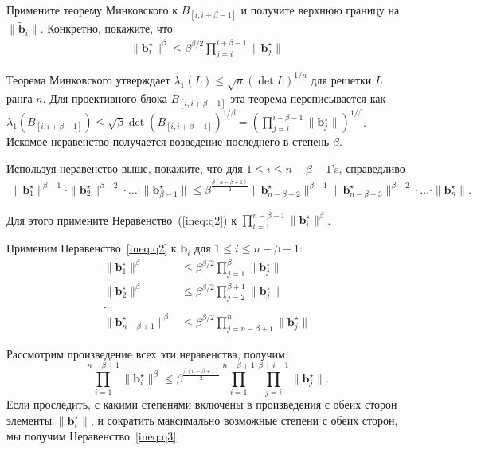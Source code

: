 \documentclass[11pt]{exam}
\theoremstyle{definition}
\renewcommand{\vec}{\mathbf}
\begin{document}
{\begin{questions}
		\question Примените теорему Минковского к $B_{[i, i+\beta-1]}$ и получите верхнюю границу на  $	\| \tilde{\vec{b}}_i \|$. Конкретно, покажите, что
		\begin{align} \label{ineq:q2}
			\| {\vec b}_i^\star \|^\beta \leq \beta^{\beta/2} \prod_{j=i}^{i+\beta - 1} \| {\vec b}^\star_j \|
		\end{align}
	
		\begin{solution}
			Теорема Минковского утверждает $\lambda_1(L) \leq \sqrt{n} (\det L)^{1/n}$ для решетки $L$ ранга $n$. Для проективного блока $B_[i, i+\beta-1]$ эта теорема переписывается как $\lambda_1(B_[i, i+\beta-1]) \leq \sqrt{\beta} \det(B_[i, i+\beta-1])^{1/\beta} = (\prod_{j=i}^{i+\beta-1} \| \vec b_j^\star \|)^{1/\beta}$. Искомое неравенство получается возведение последнего в степень $\beta$.
		\end{solution}
		
		\question Используя неравенство выше, покажите, что для $1 \leq i \leq n-\beta +1$'s, справедливо
		\begin{align}\label{ineq:q3}
		\| {\vec{b}}_1^\star \|^{\beta-1} \cdot \| {\vec{b}}_2^\star \|^{\beta-2} \cdot \ldots \cdot \| {\vec{b}}^\star_{\beta-1} \| \leq 
		\beta^{\frac{\beta(n-\beta+1)}{2}} \| {\vec{b}}^\star_{n-\beta+2} \|^{\beta-1} \| {\vec{b}}^\star_{n-\beta+3} \|^{\beta-2} \cdot \ldots \cdot  \|  {\vec{b}}^\star_n\|.
		\end{align}
	
		
		Для этого примените Неравенство~(\ref{ineq:q2}) к  $\prod_{i=1}^{n-\beta+1}\|{\vec b}^\star_i \|^\beta$.
		
		\begin{solution}
			Применим Неравенство~\ref{ineq:q2} к $\vec b_i$ для $1 \leq i \leq n-\beta+1$:
			\begin{align*}
					\| {\vec b}_1^\star \|^\beta & \leq \beta^{\beta/2} \prod_{j=1}^{\beta } \| {\vec b}^\star_j \| \\
					\| {\vec b}_2^\star \|^\beta & \leq \beta^{\beta/2} \prod_{j=2}^{\beta+1 } \| {\vec b}^\star_j \| \\
					\ldots \\
					 \| {\vec b}_{n-\beta+1}^\star \|^\beta & \leq \beta^{\beta/2} \prod_{j=n-\beta+1}^{n } \| {\vec b}^\star_j \| 
			\end{align*} 
		
		Рассмотрим произведение всех эти неравенства, получим:
		\[
			\prod_{i=1}^{n-\beta+1} \| \vec b_i^\star \|^\beta \leq \beta^{\frac{\beta(n-\beta+1)}{2}} \prod_{i=1}^{n-\beta+1} \prod_{j=i}^{\beta+i-1} \| \vec b_j^\star \|.
		\]
		Если проследить, с какими степенями включены в произведения с обеих сторон элементы $\|  \vec b_i^\star\|$, и сократить максимально возможные степени с обеих сторон, мы получим Неравенство~\ref{ineq:q3}.
		\end{solution}
		

\end{questions}}
\end{document}

